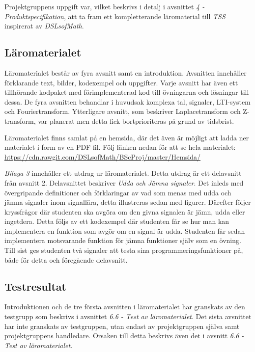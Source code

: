 \documentclass[]{article}
\begin{document}
%
Projektgruppens uppgift var, vilket beskrivs i detalj i avsnittet
\textit{4 - Produktspecifikation}, att ta fram ett kompletterande
läromaterial till \textit{TSS} inspirerat av \textit{DSLsofMath}.


\subsection{Läromaterialet}

Läromaterialet består av fyra avsnitt samt en introduktion. Avsnitten
innehåller förklarande text, bilder, kodexempel och uppgifter. Varje
avsnitt har även ett tillhörande kodpaket med förimplementerad kod
till övningarna och lösningar till dessa. De fyra avsnitten behandlar
i huvudsak komplexa tal, signaler, LTI-system och Fouriertransform.
Ytterligare avsnitt, som beskriver Laplacetransform och
Z-transform, var planerat men detta fick bortprioriteras på grund av
tidsbrist.

Läromaterialet finns samlat på en hemsida, där det även är möjligt att
ladda ner materialet i form av en PDF-fil. Följ länken nedan för att
se hela materialet:
\url{https://cdn.rawgit.com/DSLsofMath/BScProj/master/Hemsida/}


\textit{Bilaga 3} innehåller ett utdrag ur läromaterialet. Detta
utdrag är ett delavsnitt från avsnitt 2. Delavsnittet beskriver
\textit{Udda och Jämna signaler}. Det inleds med övergripande
definitioner och förklaringar av vad som menas med udda och jämna
signaler inom signallära, detta illustreras sedan med
figurer. Därefter följer kryssfrågor där studenten ska avgöra om den
givna signalen är jämn, udda eller ingetdera. Detta följs av ett
kodexempel där studenten får se hur man kan implementera en funktion
som avgör om en signal är udda. Studenten får sedan implementera
motsvarande funktion för jämna funktioner själv som en övning. Till
sist ges studenten två signaler att testa sina
programmeringsfunktioner på, både för detta och föregående delavsnitt.


\subsection{Testresultat}
Introduktionen och de tre första avsnitten i läromaterialet har
granskats av den testgrupp som beskrivs i avsnittet \textit{6.6 - Test
  av läromaterialet}. Det sista avsnittet har inte granskats av
testgruppen, utan endast av projektgruppen själva samt projektgruppens
handledare. Orsaken till detta beskrivs även det i avsnitt \textit{6.6
  - Test av läromaterialet}.
\end{document}
